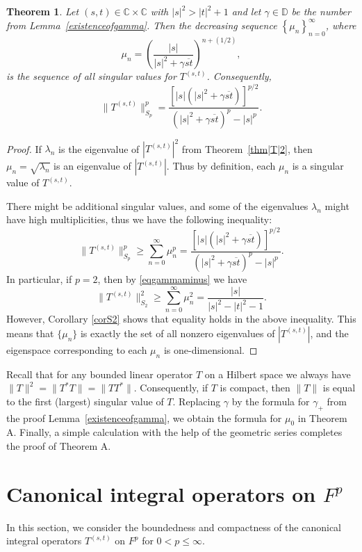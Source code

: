 \documentclass[reqno]{amsart}
\newtheorem{theorem}{Theorem}%
\newcommand{\C}{{\mathbb C}}
\newcommand{\D}{{\mathbb D}}
\begin{document}
\begin{theorem}\label{16}
Let $(s, t)\in\C\times\C$ with $|s|^2>|t|^2+1$ and let $\gamma\in\D$
be the number from Lemma~\ref{existenceofgamma}. Then the
decreasing sequence $\left\{\mu_n\right\}_{n=0}^\infty$, where
$$\mu_n=\left(\frac{|s|}{|s|^2+
\gamma{\overline{st}}}\right)^{n+(1/2)},$$
is the sequence of all singular values for $T^{(s,t)}$. Consequently,
$$\|T^{(s,t)}\|_{S_p}^p=\frac{\left[|s|
(|s|^2+\gamma{\overline{st}})\right]^{p/2}}
{(|s|^2+\gamma{\overline{st}})^p-|s|^p }.$$
\end{theorem}

\begin{proof}
If $\lambda_n$ is the eigenvalue of $\left|T^{(s,t)}\right|^2$ from
Theorem~\ref{thm|T|2}, then $\mu_n=\sqrt{\lambda_n}$ is an eigenvalue
of $\left|T^{(s,t)}\right|$. Thus by definition, each $\mu_n$ is a
singular value of $T^{(s,t)}$.

There might be additional singular values, and some of the eigenvalues
$\lambda_n$ might have high multiplicities, thus we have the following
inequality:
$$\|T^{(s,t)}\|_{S_p}^p\geq\sum_{n=0}^{\infty}\mu_n^p
=\frac{\left[|s|(|s|^2+\gamma{\overline{st}})
\right]^{p/2}}{(|s|^2+\gamma{\overline{st}})^p-|s|^p }.$$
In particular, if $p=2$, then by \eqref{eqgammaminus} we have
$$\|T^{(s,t)}\|_{S_2}^2\geq \sum_{n=0}^{\infty}\mu_n^2=
\frac{|s|}{|s|^2-|t|^2-1 }.$$
However, Corollary \ref{corS2} shows that equality holds in the above
inequality. This means that $\{\mu_n\}$ is exactly the set of all nonzero
eigenvalues of $\left|T^{(s,t)}\right|$, and the eigenspace corresponding
to each $\mu_n$ is one-dimensional.
\end{proof}

Recall that for any bounded linear operator $T$ on a Hilbert space we 
always have $\|T\|^2=\|T^*T\|=\|TT^*\|$. Consequently, if $T$ is
compact, then $\|T\|$ is equal to the first (largest) singular value of
$T$. Replacing $\gamma$ by the formula for $\gamma_+$ from the 
proof Lemma~\ref{existenceofgamma}, we obtain the formula for
$\mu_0$ in Theorem A. Finally, a simple calculation with the help of
the geometric series completes the proof of Theorem A.



\section{Canonical integral operators on $F^p$}

In this section, we consider the boundedness and compactness of the
canonical integral operators $T^{(s,t)}$ on $F^p$ for $0< p\leq\infty$.
\end{document}
